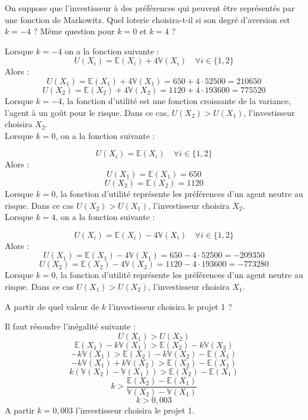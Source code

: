 \documentclass[12pt, a4paper]{exam}
\begin{document}
\begin{questions}
\question[1,25] On suppose que l'investisseur à des préférences qui peuvent être représentés par une fonction de Markowitz. Quel loterie choisira-t-il si son degré d'aversion est \( k=-4 \) ? Même question pour \( k=0 \)  et  \( k=4 \) ?
\begin{solution}
Lorsque \( k=-4 \) on a la fonction suivante : 
\[ 
U(X_i)=\mathbb{E}(X_i)+4\mathbb{V}(X_i)\quad \forall i \in \{1,2\}
 \]
Alors : 
\[ 
U(X_1)=\mathbb{E}(X_1)+4\mathbb{V}(X_1)=650+4\cdot52500=210650
\]
\[ 
U(X_2)=\mathbb{E}(X_2)+4\mathbb{V}(X_2)=1120+4\cdot193600=775520
\]
Lorsque \( k=-4 \), la fonction d'utilité est une fonction croissante de la variance, l'agent à un goût pour le risque. Dans ce cas, \( U(X_2)>U(X_1) \), l'investisseur choisira \( X_2 \).\\

Lorsque \( k=0 \), on a la fonction suivante : 

\[ 
U(X_i)=\mathbb{E}(X_i)\quad \forall i \in \{1,2\}
\]
Alors : 
\[ 
U(X_1)=\mathbb{E}(X_1)=650
\]
\[ 
U(X_2)=\mathbb{E}(X_2)=1120
\]
Lorsque \( k=0 \), la fonction d'utilité représente les préférences d'un agent neutre au risque. Dans ce cas \( U(X_2)>U(X_1) \), l'investisseur choisira \( X_2 \).\\

Lorsque \( k=4 \), on a la fonction suivante : 

\[ 
U(X_i)=\mathbb{E}(X_i)-4\mathbb{V}(X_i)\quad \forall i \in \{1,2\}
\]
Alors : 
\[ 
U(X_1)=\mathbb{E}(X_1)-4\mathbb{V}(X_1)=650-4\cdot52500=-209350
\]
\[ 
U(X_2)=\mathbb{E}(X_2)-4\mathbb{V}(X_2)=1120-4\cdot193600=-773280
\]
Lorsque \( k=0 \), la fonction d'utilité représente les préférences d'un agent neutre au risque. Dans ce cas \( U(X_1)>U(X_2) \), l'investisseur choisira \( X_1 \).
\end{solution}
	\question[1,25] A partir de quel valeur de \( k \) l'investisseur choisira le projet 1 ?

\begin{solution}
Il faut résoudre l'inégalité suivante :
\[ 
U(X_1)>U(X_2)
\]
\[ 
\mathbb{E}(X_1)-k\mathbb{V}(X_1)>\mathbb{E}(X_2)-k\mathbb{V}(X_2)
\]
\[ 
 -k\mathbb{V}(X_1)>\mathbb{E}(X_2)-k\mathbb{V}(X_2)-\mathbb{E}(X_1)
\]
\[ 
 -k\mathbb{V}(X_1)+k\mathbb{V}(X_2)>\mathbb{E}(X_2)-\mathbb{E}(X_1)
\]
\[ 
k\left(\mathbb{V}(X_2)-\mathbb{V}(X_1)\right) > \mathbb{E}(X_2)-\mathbb{E}(X_1)
 \]
 \[ 
 k>\frac{\mathbb{E}(X_2)-\mathbb{E}(X_1)}{\mathbb{V}(X_2)-\mathbb{V}(X_1)}
  \]
  \[ 
 k>0,003
\]
A partir  \( k =0,003 \) l'investisseur choisira le projet 1.
\end{solution}

\end{questions}
\end{document}
